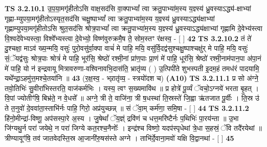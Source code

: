 \documentclass[17pt]{extarticle}
\begin{document}
                                        \textbf{ TS 3.2.10.1} \newline
                  उ॒प॒या॒मगृ॑हीतोऽसि वाक्ष॒सद॑सि वा॒क्पाभ्यां᳚ त्वा क्रतु॒पाभ्या॑म॒स्य य॒ज्ञ्स्य॑ ध्रु॒वस्याऽद्ध्य॑-क्षाभ्यां गृह्णा-म्युपया॒मगृ॑हीतोऽस्यृत॒सद॑सि चक्षु॒ष्पाभ्यां᳚ त्वा क्रतु॒पाभ्या॑म॒स्य य॒ज्ञ्स्य॑ ध्रु॒वस्याऽद्ध्य॑क्षाभ्यां गृह्णाम्युपया॒मगृ॑हीतोऽसि श्रुत॒सद॑सि श्रोत्र॒पाभ्यां᳚ त्वा क्रतु॒पाभ्या॑म॒स्य य॒ज्ञ्स्य॑ ध्रु॒वस्याऽद्ध्य॑क्षाभ्यां गृह्णामि दे॒वेभ्य॑स्त्वा वि॒श्वदे॑वेभ्यस्त्वा॒ विश्वे᳚भ्यस्त्वा दे॒वेभ्यो॒ विष्ण॑वुरुक्रमै॒ष ते॒ सोम॒स्तꣳ र॑क्षस्व॒ - [  ] \textbf{  42} \newline
                  \newline
                                \textbf{ TS 3.2.10.2} \newline
                  तं ते॑ दु॒श्चक्षा॒ माऽव॑ ख्य॒न्मयि॒ वसुः॑ पुरो॒वसु॑र्वा॒क्पा वाचं॑ मे पाहि॒ मयि॒ वसु॑र्वि॒दद्व॑सुश्चक्षु॒ष्पाश्चक्षु॑र् मे पाहि॒ मयि॒ वसुः॑ सं॒ॅयद्व॑सुः श्रोत्र॒पाः श्रोत्रं॑ मे पाहि॒ भूर॑सि॒ श्रेष्ठो॑ रश्मी॒नां प्रा॑ण॒पाः प्रा॒णं मे॑ पाहि॒ धूर॑सि॒ श्रेष्ठो॑ रश्मी॒नाम॑पान॒पा अ॑पा॒नं मे॑ पाहि॒ यो न॑ इन्द्रवायू मित्रावरुणा-वश्विनावभि॒दास॑ति॒ भ्रातृ॑व्य ( ) उ॒त्पिपी॑ते शुभस्पती इ॒दम॒हं तमध॑रं पादयामि॒ यथे᳚न्द्रा॒ऽहमु॑त्त॒मश्चे॒तया॑नि ॥ \textbf{  43} \newline
                  \newline
                      (र॒क्ष॒स्व॒ - भ्र्रातृ॑व्य॒ - स्त्रयो॑दश च)  \textbf{(A10)} \newline \newline
                                        \textbf{ TS 3.2.11.1} \newline
                  प्र सो अ॑ग्ने॒ तवो॒तिभिः॑ सु॒वीरा॑भिस्तरति॒ वाज॑कर्मभिः । यस्य॒ त्वꣳ स॒ख्यमावि॑थ ॥ प्र होत्रे॑ पू॒र्व्यं ॅवचो॒ऽग्नये॑ भरता बृ॒हत् । वि॒पां ज्योतीꣳ॑षि॒ बिभ्र॑ते॒ न वे॒धसे᳚ ॥ अग्ने॒ त्री ते॒ वाजि॑ना॒ त्री ष॒धस्था॑ ति॒स्रस्ते॑ जि॒ह्वा ऋ॑तजात पू॒र्वीः । ति॒स्र उ॑ ते त॒नुवो॑ दे॒ववा॑ता॒स्ताभि॑र्नः पाहि॒ गिरो॒ अप्र॑युच्छन्न् ॥ सं ॅवा॒म् कर्म॑णा॒ समि॒षा - [  ] \textbf{  44} \newline
                  \newline
                                \textbf{ TS 3.2.11.2} \newline
                  हि॑नो॒मीन्द्रा॑-विष्णू॒ अप॑सस्पा॒रे अ॒स्य । जु॒षेथां᳚ ॅय॒ज्ञ्ं द्रवि॑णं च धत्त॒मरि॑ष्टैर्नः प॒थिभिः॑ पा॒रय॑न्ता ॥ उ॒भा जि॑ग्यथु॒र्न परा॑ जयेथे॒ न परा॑ जिग्ये कत॒रश्च॒नैनोः᳚ । इन्द्र॑श्च विष्णो॒ यदप॑स्पृधेथां त्रे॒धा स॒हस्रं॒ ॅवि तदै॑रयेथां ॥ त्रीण्यायूꣳ॑षि॒ तव॑ जातवेदस्ति॒स्र आ॒जानी॑रु॒षस॑स्ते अग्ने । ताभि॑र्दे॒वाना॒मवो॑ यक्षि वि॒द्वानथा॑ - [  ] \textbf{  45} \newline
\end{document}
